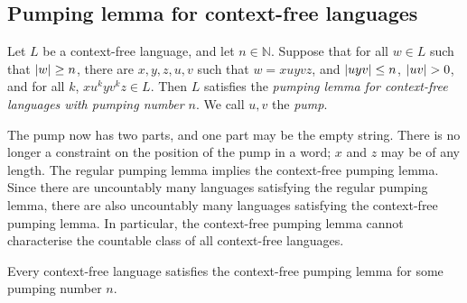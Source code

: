 \subsection{Pumping lemma for context-free languages}
\begin{definition}
	Let \( L \) be a context-free language, and let \( n \in \mathbb N \).
	Suppose that for all \( w \in L \) such that \( \abs{w} \geq n \), there are \( x, y, z, u, v \) such that \( w = xuyvz \), and \( \abs{uyv} \leq n \), \( \abs{uv} > 0 \), and for all \( k \), \( xu^kyv^kz \in L \).
	Then \( L \) satisfies the \emph{pumping lemma for context-free languages with pumping number \( n \)}.
	We call \( u,v \) the \emph{pump}.
\end{definition}
\begin{remark}
	The pump now has two parts, and one part may be the empty string.
	There is no longer a constraint on the position of the pump in a word; \( x \) and \( z \) may be of any length.
	The regular pumping lemma implies the context-free pumping lemma.
	Since there are uncountably many languages satisfying the regular pumping lemma, there are also uncountably many languages satisfying the context-free pumping lemma.
	In particular, the context-free pumping lemma cannot characterise the countable class of all context-free languages.
\end{remark}
\begin{theorem}
	Every context-free language satisfies the context-free pumping lemma for some pumping number \( n \).
\end{theorem}

